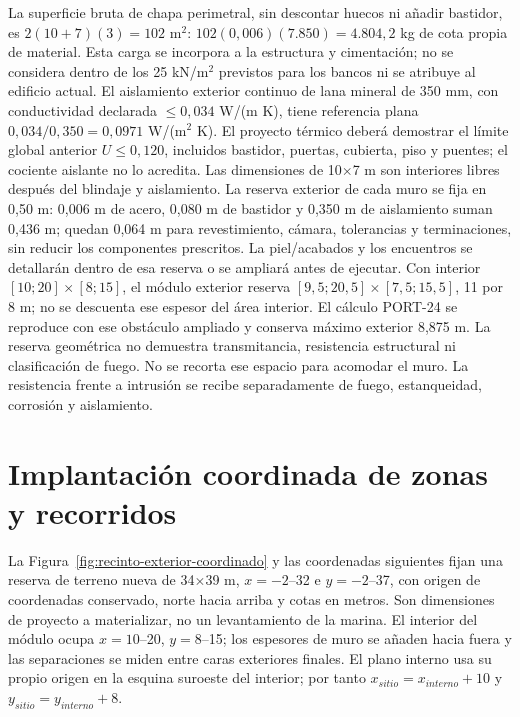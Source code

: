 La superficie bruta de chapa perimetral, sin descontar huecos ni añadir bastidor, es $2(10+7)(3)=102$ m$^2$: $102(0,006)(7.850)=4.804,2$ kg de cota propia de material. Esta carga se incorpora a la estructura y cimentación; no se considera dentro de los 25 kN/m$^2$ previstos para los bancos ni se atribuye al edificio actual. El aislamiento exterior continuo de lana mineral de 350 mm, con conductividad declarada $\leq0,034$ W/(m K), tiene referencia plana $0,034/0,350=0,0971$ W/(m$^2$ K). El proyecto térmico deberá demostrar el límite global anterior $U\leq0,120$, incluidos bastidor, puertas, cubierta, piso y puentes; el cociente aislante no lo acredita. Las dimensiones de 10$\times$7 m son interiores libres después del blindaje y aislamiento. La reserva exterior de cada muro se fija en 0,50 m: 0,006 m de acero, 0,080 m de bastidor y 0,350 m de aislamiento suman 0,436 m; quedan 0,064 m para revestimiento, cámara, tolerancias y terminaciones, sin reducir los componentes prescritos. La piel/acabados y los encuentros se detallarán dentro de esa reserva o se ampliará antes de ejecutar. Con interior $[10;20]\times[8;15]$, el módulo exterior reserva $[9,5;20,5]\times[7,5;15,5]$, 11 por 8 m; no se descuenta ese espesor del área interior. El cálculo PORT-24 se reproduce con ese obstáculo ampliado y conserva máximo exterior 8,875 m. La reserva geométrica no demuestra transmitancia, resistencia estructural ni clasificación de fuego. No se recorta ese espacio para acomodar el muro. La resistencia frente a intrusión se recibe separadamente de fuego, estanqueidad, corrosión y aislamiento.

\section{Implantación coordinada de zonas y recorridos}
\label{sec:recinto-implantacion-coordinada}
La Figura~\ref{fig:recinto-exterior-coordinado} y las coordenadas siguientes fijan una reserva de terreno nueva de 34$\times$39 m, $x=-2$--32 e $y=-2$--37, con origen de coordenadas conservado, norte hacia arriba y cotas en metros. Son dimensiones de proyecto a materializar, no un levantamiento de la marina. El interior del módulo ocupa $x=10$--20, $y=8$--15; los espesores de muro se añaden hacia fuera y las separaciones se miden entre caras exteriores finales. El plano interno usa su propio origen en la esquina suroeste del interior; por tanto $x_{sitio}=x_{interno}+10$ y $y_{sitio}=y_{interno}+8$.

